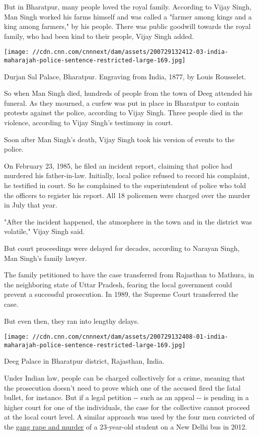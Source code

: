 But in Bharatpur, many people loved the royal family. According to Vijay
Singh, Man Singh worked his farms himself and was called a "farmer among
kings and a king among farmers," by his people. There was public
goodwill towards the royal family, who had been kind to their people,
Vijay Singh added.

\texttt{[image: //cdn.cnn.com/cnnnext/dam/assets/200729132412-03-india-maharajah-police-sentence-restricted-large-169.jpg]}

Durjan Sal Palace, Bharatpur. Engraving from India, 1877, by Louis
Rousselet.

So when Man Singh died, hundreds of people from the town of Deeg
attended his funeral. As they mourned, a curfew was put in place in
Bharatpur to contain protests against the police, according to Vijay
Singh. Three people died in the violence, according to Vijay Singh's
testimony in court.

Soon after Man Singh's death, Vijay Singh took his version of events to
the police.

On February 23, 1985, he filed an incident report, claiming that police
had murdered his father-in-law. Initially, local police refused to
record his complaint, he testified in court. So he complained to the
superintendent of police who told the officers to register his report.
All 18 policemen were charged over the murder in July that year.

"After the incident happened, the atmosphere in the town and in the
district was volatile," Vijay Singh said.

But court proceedings were delayed for decades, according to Narayan
Singh, Man Singh's family lawyer.

The family petitioned to have the case transferred from Rajasthan to
Mathura, in the neighboring state of Uttar Pradesh, fearing the local
government could prevent a successful prosecution. In 1989, the Supreme
Court transferred the case.

But even then, they ran into lengthy delays.

\texttt{[image: //cdn.cnn.com/cnnnext/dam/assets/200729132408-01-india-maharajah-police-sentence-restricted-large-169.jpg]}

Deeg Palace in Bharatpur district, Rajasthan, India.

Under Indian law, people can be charged collectively for a crime,
meaning that the prosecution doesn't need to prove which one of the
accused fired the fatal bullet, for instance. But if a legal petition
-\/- such as an appeal -\/- is pending in a higher court for one of the
individuals, the case for the collective cannot proceed at the local
court level. A similar approach was used by the four men convicted of
the
\href{https://edition.cnn.com/2020/03/19/asia/india-rape-execution-intl-hnk/index.html}{gang
rape and murder} of a 23-year-old student on a New Delhi bus in 2012.


